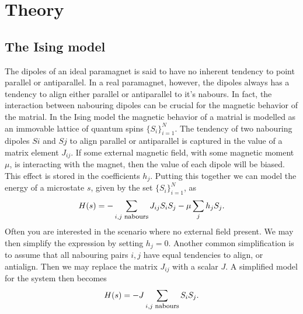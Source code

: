 \documentclass[twoside,utf8]{article}
\newcommand{\EQU}[1] { \begin{equation*} \begin{split} #1 \end{split} \end{equation*} }
\newcommand{\EQUn}[1] { \begin{equation} \begin{split} #1 \end{split} \end{equation} }
\begin{document}
\section{Theory}
\subsection{The Ising model}
The dipoles of an ideal paramagnet is said to have no inherent tendency to point parallel or antiparallel. In a real paramagnet, however, the dipoles always has a tendency to align either parallel or antiparallel to it's nabours. In fact, the interaction between nabouring dipoles can be crucial for the magnetic behavior of the matrial. In the Ising model the magnetic behavior of a matrial is modelled as an immovable lattice of quantum spins $\{S_i\}_{i=1}^{N}$. The tendency of two nabouring dipoles $Si$ and $Sj$ to align parallel or antiparallel is captured in the value of a matrix element $J_{ij}$.  If some external magnetic field, with some magnetic moment $\mu$, is interacting with the magnet, then the value of each dipole will be biased. This effect is stored in the coefficients $h_j$. Putting this together we can model the energy of a microstate $s$, given by the set $\{S_i\}_{i=1}^{N}$, as 
\EQU{
H(s) = -\sum_{i,j \text{ \footnotesize nabours} }J_{ij}S_i S_j - \mu \sum_j h_j S_j.
}
Often you are interested in the scenario where no external field present. We may then simplify the expression by setting $h_j=0$. Another common simplification is to assume that all nabouring pairs $i,j$ have equal tendencies to align, or antialign. Then we may replace the matrix $J_{ij}$ with a scalar $J$. A simplified model for the system then becomes
\EQUn{
H(s) = -J \sum_{i,j \text{ \footnotesize nabours} }S_i S_j \label{H(s)}.
}
\end{document}
